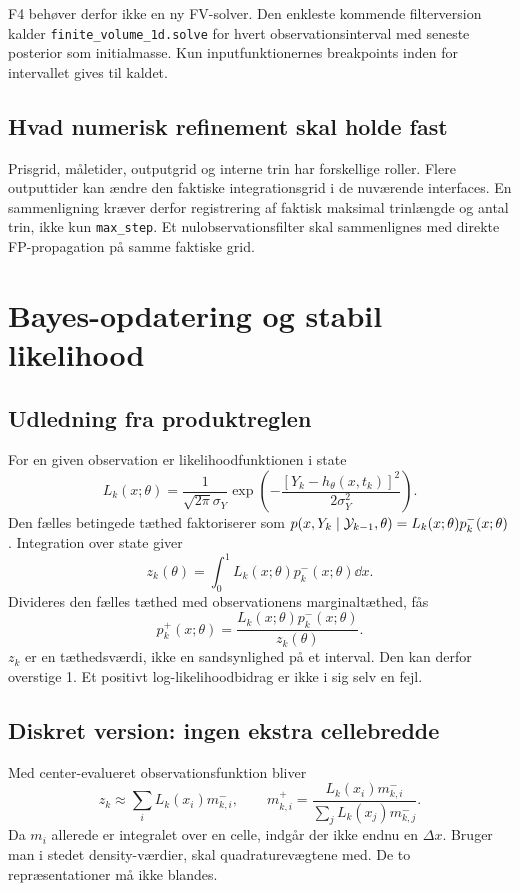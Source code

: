 F4 behøver derfor ikke en ny FV-solver. Den enkleste kommende filterversion kalder \texttt{finite\_volume\_1d.solve} for hvert observationsinterval med seneste posterior som initialmasse. Kun inputfunktionernes breakpoints inden for intervallet gives til kaldet.

\subsection{Hvad numerisk refinement skal holde fast}
Prisgrid, måletider, outputgrid og interne trin har forskellige roller. Flere outputtider kan ændre den faktiske integrationsgrid i de nuværende interfaces. En sammenligning kræver derfor registrering af faktisk maksimal trinlængde og antal trin, ikke kun \texttt{max\_step}. Et nulobservationsfilter skal sammenlignes med direkte FP-propagation på samme faktiske grid.

\section{Bayes-opdatering og stabil likelihood}
\subsection{Udledning fra produktreglen}
For en given observation er likelihoodfunktionen i state
\begin{equation}
 L_k(x;\theta)=\frac{1}{\sqrt{2\pi}\sigma_Y}
 \exp\!\left(-\frac{[Y_k-h_\theta(x,t_k)]^2}{2\sigma_Y^2}\right).
 \label{eq:likelihood}
\end{equation}
Den fælles betingede tæthed faktoriserer som
\(p(x,Y_k\mid\mathcal Y_{k-1},\theta)=L_k(x;\theta)p_k^-(x;\theta)\).
Integration over state giver
\begin{equation}
 z_k(\theta)=\int_0^1 L_k(x;\theta)p_k^-(x;\theta)\dd x.
 \label{eq:evidence}
\end{equation}
Divideres den fælles tæthed med observationens marginaltæthed, fås
\begin{equation}
 \boxed{p_k^+(x;\theta)=\frac{L_k(x;\theta)p_k^-(x;\theta)}{z_k(\theta)}.}
 \label{eq:bayes}
\end{equation}
\(z_k\) er en tæthedsværdi, ikke en sandsynlighed på et interval. Den kan derfor overstige 1. Et positivt log-likelihoodbidrag er ikke i sig selv en fejl.

\subsection{Diskret version: ingen ekstra cellebredde}
Med center-evalueret observationsfunktion bliver
\begin{equation}
 z_k\approx\sum_i L_k(x_i) m_{k,i}^-,\qquad
 m_{k,i}^+=\frac{L_k(x_i)m_{k,i}^-}{\sum_jL_k(x_j)m_{k,j}^-}.
 \label{eq:discretebayes}
\end{equation}
Da \(m_i\) allerede er integralet over en celle, indgår der ikke endnu en \(\Delta x\). Bruger man i stedet density-værdier, skal quadraturevægtene med. De to repræsentationer må ikke blandes.

